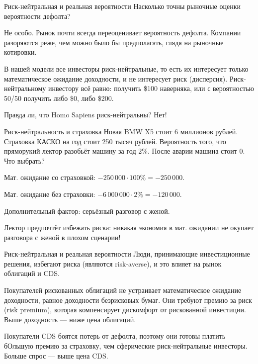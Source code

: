 \documentclass{beamer}
\begin{document}
\begin{frame}{Риск-нейтральная и реальная вероятности}
\justify
Насколько точны рыночные оценки вероятности дефолта?

\vspace{\baselineskip}
Не особо. Рынок почти всегда \alert{переоценивает} вероятность дефолта. Компании разоряются \alert{реже}, чем можно было бы предполагать, глядя на рыночные котировки.

\vspace{\baselineskip}
В нашей модели все инвесторы риск-нейтральные, то есть их интересует только математическое ожидание доходности, и не интересует риск (дисперсия). Риск-нейтральному инвестору всё равно: получить \$100 наверняка, или с вероятностью 50/50 получить либо \$0, либо \$200.

\vspace{\baselineskip}
Правда ли, что Homo Sapiens риск-нейтральны? Нет!
\end{frame}



\begin{frame}{Риск-нейтральность и страховка}
\justify
Новая BMW X5 стоит 6 миллионов рублей. Страховка КАСКО на год стоит 250 тысяч рублей. Вероятность того, что пряморукий лектор разобьёт машину за год 2\%. После аварии машина стоит 0. Что выбрать?

\justify
Мат. ожидание со страховкой: $-250\,000 \cdot 100\% = -250\,000$.

\justify
Мат. ожидание без страховки: $-6\,000\,000 \cdot 2\% = -120\,000$.

Дополнительный фактор: серьёзный разговор с женой.

\justify
Лектор предпочтёт избежать риска: никакая экономия в мат. ожидании не окупает
разговора с женой в плохом сценарии!
\end{frame}



\begin{frame}{Риск-нейтральная и реальная вероятности}
\justify
Люди, принимающие инвестиционные решения, избегают риска (являются risk-averse), и это влияет на рынок облигаций и CDS.

\justify
Покупателей рискованных облигаций не устраивает математическое ожидание доходности, равное доходности безрисковых бумаг. Они требуют премию за риск (risk premium), которая компенсирует дискомфорт от рискованной инвестиции. Выше доходность --- ниже цена облигаций.

\justify
Покупатели CDS боятся потерь от дефолта, поэтому они готовы платить бОльшую премию за страховку, чем сферические риск-нейтральные инвесторы. Больше спрос --- выше цена CDS.
\end{frame}
\end{document}
